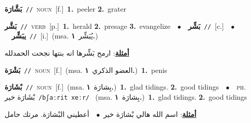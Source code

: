 \documentclass[10pt,a4paper,twoside]{article} %
\begin{document}
\begin{multicols}{2}
{\setlength\topsep{0pt}\textbf{\foreignlanguage{arabic}{بَشَّارَة}}\ {\color{gray}\texttt{//}\color{black}}\ \textsc{noun}\ [f.]\ \textbf{1.}~peeler  \textbf{2.}~grater\ } \vspace{2mm}

{\setlength\topsep{0pt}\textbf{\foreignlanguage{arabic}{بَشَّر}}\ {\color{gray}\texttt{//}\color{black}}\ \textsc{verb}\ [p.]\ \textbf{1.}~herald  \textbf{2.}~presage  \textbf{3.}~evangelize\ \ $\bullet$\ \ \setlength\topsep{0pt}\textbf{\foreignlanguage{arabic}{بَشِّر}}\ {\color{gray}\texttt{//}\color{black}}\ [c.]\ \ $\bullet$\ \ \setlength\topsep{0pt}\textbf{\foreignlanguage{arabic}{يبَشِّر}}\ {\color{gray}\texttt{//}\color{black}}\ [i.]\ \color{gray}(msa. \foreignlanguage{arabic}{يُبَشِّر}~\foreignlanguage{arabic}{\textbf{١.}})\color{black}\  \begin{flushright}\color{gray}\foreignlanguage{arabic}{\textbf{\underline{\foreignlanguage{arabic}{أمثلة}}}: ارمح بَشِّرها انه بنتها نجحت الحمدلله}\end{flushright}\color{black}} \vspace{2mm}

{\setlength\topsep{0pt}\textbf{\foreignlanguage{arabic}{بَشْرَة}}\ {\color{gray}\texttt{//}\color{black}}\ \textsc{noun}\ [f.]\ \color{gray}(msa. \foreignlanguage{arabic}{العضو الذكري}~\foreignlanguage{arabic}{\textbf{١.}})\color{black}\ \textbf{1.}~penis\ } \vspace{2mm}

{\setlength\topsep{0pt}\textbf{\foreignlanguage{arabic}{بْشَارَة}}\ {\color{gray}\texttt{//}\color{black}}\ \textsc{noun}\ [f.]\ \color{gray}(msa. \foreignlanguage{arabic}{بِشارَة}~\foreignlanguage{arabic}{\textbf{١.}})\color{black}\ \textbf{1.}~glad tidings.  \textbf{2.}~good tidings\ \ $\bullet$\ \ \textsc{ph.} \color{gray} \foreignlanguage{arabic}{بْشَارَة خير}\color{black}\ {\color{gray}\texttt{/{\sffamily bʃaːrit xeːr}/}\color{black}}\ \color{gray} (msa. \foreignlanguage{arabic}{بِشارَة}~\foreignlanguage{arabic}{\textbf{١.}})\color{black}\ \textbf{1.}~glad tidings.  \textbf{2.}~good tidings\  \begin{flushright}\color{gray}\foreignlanguage{arabic}{\textbf{\underline{\foreignlanguage{arabic}{أمثلة}}}: اسم الله هالي  بْشارَة خير\ $\bullet$\ \  أعطيني البْشارَة. مرتك حامل}\end{flushright}\color{black}} \vspace{2mm}


\end{multicols}
\end{document}
